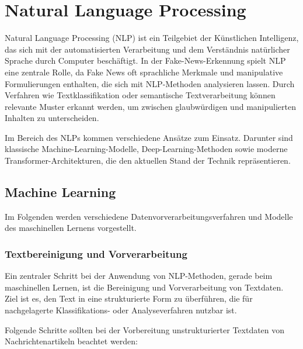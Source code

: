 \chapter{Natural Language Processing}
\label{chap:nlp}

Natural Language Processing (NLP) ist ein Teilgebiet der Künstlichen Intelligenz, das sich mit der automatisierten Verarbeitung und dem Verständnis
natürlicher Sprache durch Computer beschäftigt. In der Fake-News-Erkennung spielt NLP eine zentrale Rolle, da Fake News oft sprachliche 
Merkmale und manipulative Formulierungen enthalten, die sich mit NLP-Methoden analysieren lassen. Durch Verfahren wie Textklassifikation 
oder semantische Textverarbeitung können relevante Muster erkannt werden, um zwischen glaubwürdigen und manipulierten Inhalten zu unterscheiden.

Im Bereich des NLPs kommen verschiedene Ansätze zum Einsatz. Darunter sind klassische Machine-Learning-Modelle, Deep-Learning-Methoden 
sowie moderne Transformer-Architekturen, die den aktuellen Stand der Technik repräsentieren.

\section{Machine Learning}
\label{sec:ml}

Im Folgenden werden verschiedene Datenvorverarbeitungsverfahren und Modelle des maschinellen Lernens vorgestellt.

\subsection{Textbereinigung und Vorverarbeitung}
\label{sec:text_vorverarbeitung}

Ein zentraler Schritt bei der Anwendung von NLP-Methoden, gerade beim maschinellen Lernen, ist die Bereinigung und Vorverarbeitung von Textdaten. 
Ziel ist es, den Text in eine strukturierte Form zu überführen, die für nachgelagerte Klassifikations- oder Analyseverfahren nutzbar ist.

Folgende Schritte sollten bei der Vorbereitung unstrukturierter Textdaten von Nachrichtenartikeln beachtet werden:

